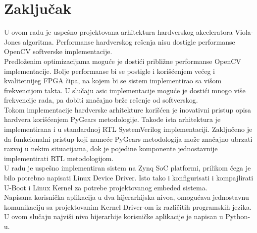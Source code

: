 \section{Zaključak}

U ovom radu je uspešno projektovana arhitektura hardverskog akceleratora
Viola-Jones algoritma.
Performanse hardverskog rešenja nisu dostigle performanse OpenCV softverske
implementacije. \\

Predloženim optimizacijama moguće je dostići približne performanse OpenCV
implementacije.
Bolje performanse bi se postigle i korišćenjem većeg i kvalitetnijeg FPGA čipa,
na kojem bi se sistem implementirao sa višom frekvencijom takta.
U slučaju \gls{asic} implementacije moguće je dostići mnogo više
frekvencije rada, pa dobiti značajno brže rešenje od softverskog. \\

Tokom implementacije hardverske arhitekture korišćen je inovativni pristup opisa
hardvera korišćenjem PyGears metodologije.
Takođe ista arhitektura je implementirana i u standardnoj RTL SystemVerilog
implementaciji.
Zaključeno je da funkcionalni pristup koji nameće PyGears metodologija može
značajno ubrzati razvoj u nekim situacijama, dok je pojedine komponente
jednostavnije implementirati RTL metodologijom. \\

U radu je uspešno implementiran sistem na Zynq SoC platformi, prilikom
čega je bilo potrebno napisati Linux Device Driver.
Isto tako i konfigurisati i kompajlirati U-Boot i Linux Kernel za potrebe
projektovanog embeded sistema. \\
Napisana korisnička aplikacija u dva hijerarhijska nivoa, omogućava jednostavnu
komunikaciju sa projektovanim Kernel Driver-om iz različitih programskih jezika.
U ovom slučaju najviši nivo hijerarhije korisničke aplikacije je napisan u
Python-u. \\